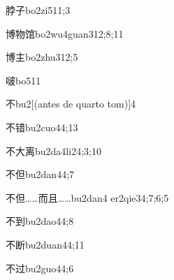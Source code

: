 \begin{verbete}{脖子}{bo2zi5}{11;3}
\end{verbete}

\begin{verbete}{博物馆}{bo2wu4guan3}{12;8;11}
\end{verbete}

\begin{verbete}{博主}{bo2zhu3}{12;5}
\end{verbete}

\begin{verbete}{啵}{bo5}{11}
\end{verbete}

\begin{verbete}{不}{bu2}[(antes de quarto tom)]{4}
\end{verbete}

\begin{verbete}{不错}{bu2cuo4}{4;13}
\end{verbete}

\begin{verbete}{不大离}{bu2da4li2}{4;3;10}
\end{verbete}

\begin{verbete}{不但}{bu2dan4}{4;7}
\end{verbete}

\begin{verbete}{不但……而且……}{bu2dan4 er2qie3}{4;7;6;5}
\end{verbete}

\begin{verbete}{不到}{bu2dao4}{4;8}
\end{verbete}

\begin{verbete}{不断}{bu2duan4}{4;11}
\end{verbete}

\begin{verbete}{不过}{bu2guo4}{4;6}
\end{verbete}

